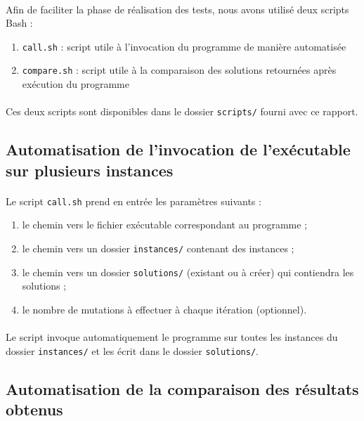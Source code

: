 \paragraph{}
Afin de faciliter la phase de réalisation des tests, nous avons utilisé deux scripts Bash :
\begin{enumerate}
\item \texttt{call.sh} : script utile à l'invocation du programme de manière automatisée
\item \texttt{compare.sh} : script utile à la comparaison des solutions retournées après exécution du programme
\end{enumerate}
\paragraph{}
Ces deux scripts sont disponibles dans le dossier \texttt{scripts/} fourni avec ce rapport.

\newpage

\subsection{Automatisation de l'invocation de l'exécutable sur plusieurs instances}

\paragraph{}
Le script \texttt{call.sh} prend en entrée les paramètres suivants :
\begin{enumerate}
\item le chemin vers le fichier exécutable correspondant au programme ;
\item le chemin vers un dossier \texttt{instances/} contenant des instances ;
\item le chemin vers un dossier \texttt{solutions/} (existant ou à créer) qui contiendra les solutions ;
\item le nombre de mutations à effectuer à chaque itération (optionnel).
\end{enumerate}
\paragraph{}
Le script invoque automatiquement le programme sur toutes les instances du dossier \texttt{instances/} et les écrit dans le dossier \texttt{solutions/}.

\subsection{Automatisation de la comparaison des résultats obtenus}

